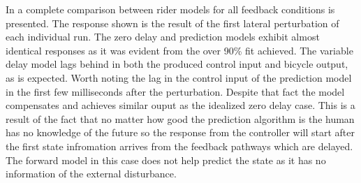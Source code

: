 In   a complete comparison between rider models for all feedback conditions is presented. The response shown is the result of the first lateral perturbation of each individual run. The zero delay and prediction models exhibit almost identical responses as it was evident from the over 90\% fit achieved. The variable delay model lags behind in both the produced control input and bicycle output, as is expected. Worth noting the lag in the control input of the prediction model in the first few milliseconds after the perturbation. Despite that fact the model compensates and achieves similar ouput as the idealized zero delay case. This is a result of the fact that no matter how good the prediction algorithm is the human has no knowledge of the future so the response from the controller will start after the first state infromation arrives from the feedback pathways which are delayed. The forward model in this case does not help predict the state as it has no information of the external disturbance. 





